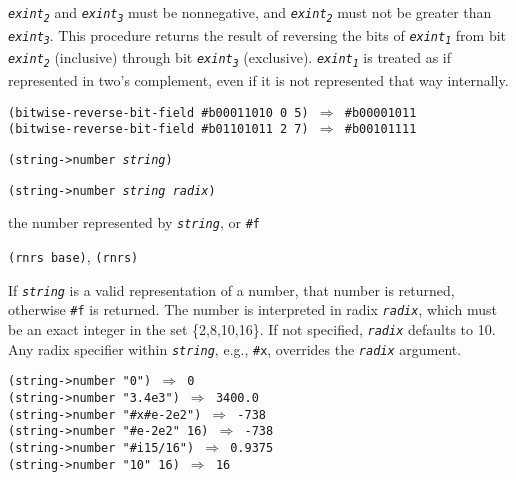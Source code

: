 \texttt{\textit{exint\textsubscript{2}}} and \texttt{\textit{exint\textsubscript{3}}} must be nonnegative, and \texttt{\textit{exint\textsubscript{2}}}
must not be greater than \texttt{\textit{exint\textsubscript{3}}}.
This procedure returns the result of reversing the bits of
\texttt{\textit{exint\textsubscript{1}}} from bit \texttt{\textit{exint\textsubscript{2}}} (inclusive) through bit \texttt{\textit{exint\textsubscript{3}}} (exclusive).
\texttt{\textit{exint\textsubscript{1}}} is treated as if represented in two's complement, even
if it is not represented that way internally.

\begin{alltt}
(bitwise-reverse-bit-field \#{}b00011010 0 5) \(\Rightarrow\) \#{}b00001011
(bitwise-reverse-bit-field \#{}b01101011 2 7) \(\Rightarrow\) \#{}b00101111
\end{alltt}

\begin{description}

\label{objects_s147}\item[procedure] \texttt{(string-\textgreater{}number \textit{string})}



\item[procedure] \texttt{(string-\textgreater{}number \textit{string} \textit{radix})}



\item[returns] the number represented by \texttt{\textit{string}}, or \texttt{\#{}f}


\item[libraries] \texttt{(rnrs base)}, \texttt{(rnrs)}
\end{description}


If \texttt{\textit{string}} is a valid representation of a number, that
number is returned, otherwise \texttt{\#{}f} is returned.
The number is interpreted in radix \texttt{\textit{radix}}, which must be an
exact integer in the set \{2,8,10,16\}.
If not specified, \texttt{\textit{radix}} defaults to 10.
Any radix specifier within \texttt{\textit{string}}, e.g., \texttt{\#{}x}, overrides the
\texttt{\textit{radix}} argument.


\begin{alltt}
(string-\textgreater{}number "0") \(\Rightarrow\) 0
(string-\textgreater{}number "3.4e3") \(\Rightarrow\) 3400.0
(string-\textgreater{}number "\#{}x\#{}e-2e2") \(\Rightarrow\) -738
(string-\textgreater{}number "\#{}e-2e2" 16) \(\Rightarrow\) -738
(string-\textgreater{}number "\#{}i15/16") \(\Rightarrow\) 0.9375
(string-\textgreater{}number "10" 16) \(\Rightarrow\) 16
\end{alltt}

